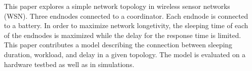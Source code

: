 This paper explores a simple network topology in wireless sensor networks (WSN). Three endnodes connected to a coordinator. Each endnode is connected to a battery. In order to maximize network longetivity, the sleeping time of each of the endnodes is maximized while the delay for the response time is limited. This paper contributes a model describing the connection between sleeping duration, workload, and delay in a given topology. The model is evaluated on a hardware testbed as well as in simulations.